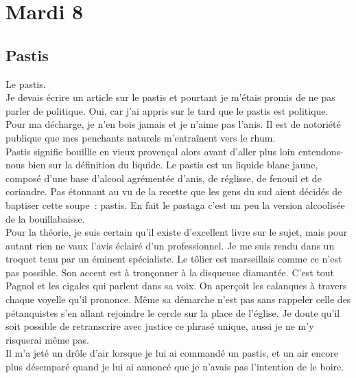 ﻿\section*{Mardi 8}
\subsection*{Pastis}

Le pastis.\\
Je devais écrire un article sur le pastis et pourtant je m’étais promis de ne pas parler de politique. Oui, car j’ai appris sur le tard que le pastis est politique. Pour ma décharge, je n’en bois jamais et je n’aime pas l’anis. Il est de notoriété publique que mes penchants naturels m’entraînent vers le rhum.\\

Pastis signifie bouillie en vieux provençal alors avant d’aller plus loin entendons-nous bien sur la définition du liquide. Le pastis est un liquide blanc jaune, composé d’une base d’alcool agrémentée d’anis, de réglisse, de fenouil et de coriandre. Pas étonnant au vu de la recette que les gens du sud aient décidés de baptiser cette soupe : pastis. En fait le pastaga c’est un peu la version alcoolisée de la bouillabaisse.\\
Pour la théorie, je suis certain qu’il existe d’excellent livre sur le sujet, mais pour autant rien ne vaux l’avis éclairé d’un professionnel. Je me suis rendu dans un troquet tenu par un éminent spécialiste. Le tôlier est marseillais comme ce n’est pas possible. Son accent est à tronçonner à la disqueuse diamantée. C’est tout Pagnol et les cigales qui parlent dans sa voix. On aperçoit les calanques à travers chaque voyelle qu’il prononce. Même sa démarche n’est pas sans rappeler celle des pétanquistes s’en allant rejoindre le cercle sur la place de l’église. Je doute qu’il soit possible de retranscrire avec justice ce phrasé unique, aussi je ne m’y risquerai même pas.\\

Il m’a jeté un drôle d’air lorsque je lui ai commandé un pastis, et un air encore plus désemparé quand je lui ai annoncé que je n’avais pas l’intention de le boire.\\

